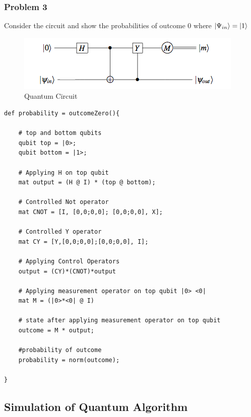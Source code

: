 \subsubsection{Problem 3}
Consider the circuit and show the probabilities of outcome 0 where $|\Psi_{in}\rangle = |1\rangle$
\begin{figure}[h!]
\begin{center}
\includegraphics{circuit2}
\end{center}
\caption{ Quantum Circuit 
\label{cir1}}
\end{figure}

\begin{lstlisting}
def probability = outcomeZero(){
	
	# top and bottom qubits
	qubit top = |0>;
	qubit bottom = |1>;
	
	# Applying H on top qubit 
	mat output = (H @ I) * (top @ bottom);
	
	# Controlled Not operator
	mat CNOT = [I, [0,0;0,0]; [0,0;0,0], X];
	
	# Controlled Y operator
	mat CY = [Y,[0,0;0,0];[0,0;0,0], I];
	
	# Applying Control Operators
	output = (CY)*(CNOT)*output
	
	# Applying measurement operator on top qubit |0> <0|
	mat M = (|0>*<0| @ I)
	
	# state after applying measurement operator on top qubit
	outcome = M * output;
	
	#probability of outcome
	probability = norm(outcome);
	
}
\end{lstlisting}

\subsection{ Simulation of Quantum Algorithm}

